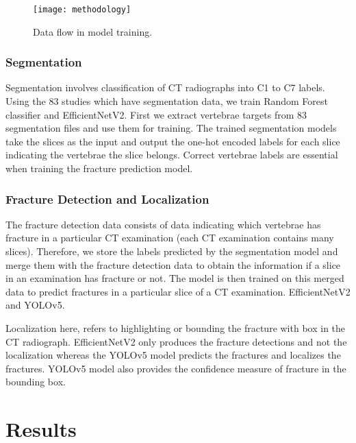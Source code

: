 \documentclass[pdflatex,sn-mathphys]{sn-jnl}%
\theoremstyle{thmstyleone}%
\theoremstyle{thmstyletwo}%
\theoremstyle{thmstylethree}%
\begin{document}
\begin{figure}[H]
 \begin{minipage}[c]{1\textwidth}
 \centering
    \texttt{[image: methodology]}
    \caption{\centering\footnotesize{ Data flow in model training. }}
    \label{fig:flow}
\end{minipage}
\end{figure}

\subsubsection{Segmentation}

Segmentation involves classification of CT radiographs into C1 to C7 labels. Using the 83 studies which have segmentation data, we train Random Forest classifier\cite{SEG:RandForest} and EfficientNetV2\cite{DBLP:conf/icml/TanL21}. First we extract vertebrae targets from 83 segmentation files and use them for training. The trained segmentation models take the slices as the input and output the one-hot encoded labels for each slice indicating the vertebrae the slice belongs. Correct vertebrae labels are essential when training the fracture prediction model. 

\subsubsection{Fracture Detection and Localization}

The fracture detection data consists of data indicating which vertebrae has fracture in a particular CT examination (each CT examination contains many slices). Therefore, we store the labels predicted by the segmentation model and merge them with the fracture detection data to obtain the information if a slice in an examination has fracture or not. The model is then trained on this merged data to predict fractures in a particular slice of a CT examination. EfficientNetV2 and YOLOv5\cite{glenn_jocher_2022_7347926}. 

Localization here, refers to highlighting or bounding the fracture with box in the CT radiograph. EfficientNetV2 only produces the fracture detections and not the localization whereas the YOLOv5 model predicts the fractures and localizes the fractures. YOLOv5 model also provides the confidence measure of fracture in the bounding box.

\section{Results}\label{sec3}
\end{document}
